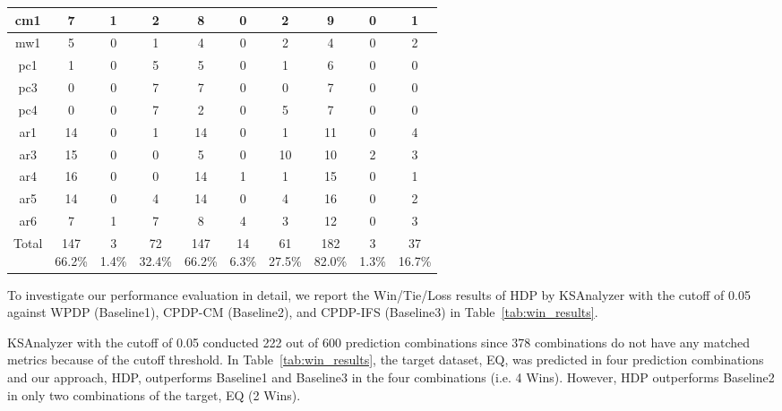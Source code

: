 \begin{table}[!t]
\begin{tabular}{|c||@{ }c@{ }|@{ }c@{ }|@{ }c@{}||@{ }c@{ }|@{ }c@{
}|@{ }c@{}||@{ }c@{ }|@{ }c@{ }|@{ }c@{}|}
cm1			&7	&1	&2 & 8 & 0 & 2 &9 &0 &1	\\ \hline
mw1			&5	&0	&1 & 4 & 0 & 2 &4 &0 &2	\\ \hline
pc1			&1	&0	&5 & 5 & 0 & 1 &6 &0 &0	\\ \hline
pc3			&0	&0	&7 & 7 & 0 & 0 &7 &0 &0	\\ \hline
pc4			&0	&0	&7 & 2 & 0 & 5 &7 &0 &0	\\ \hline \hline

ar1		&14	&0	&1	& 14 & 0 & 1 &11 &0 &4 \\ \hline
ar3		&15	&0	&0	& 5 & 0 & 10 &10 &2 &3 \\ \hline
ar4		&16	&0	&0	& 14 & 1 & 1 &15 &0 &1 \\ \hline
ar5		&14	&0	&4	& 14 & 0 & 4 &16 &0 &2 \\ \hline
ar6		&7	&1	&7	& 8 & 4 & 3  &12 &0 &3 \\ \hline \hline
Total & \specialcell{{147}\\{66.2\%}} &\specialcell{{3}\\{1.4\%}}
&\specialcell{{72}\\{32.4\%}}
& \specialcell{{147}\\{66.2\%}} &\specialcell{{14}\\{6.3\%}}
&\specialcell{{61}\\{27.5\%}}
& \specialcell{{182}\\{82.0\%}} &\specialcell{{3}\\{1.3\%}}
&\specialcell{{37}\\{16.7\%}}
\\
\hline
\end{tabular}
\end{table}


To investigate our performance evaluation in detail, we report
the Win/Tie/Loss results of HDP by KSAnalyzer with the cutoff of 0.05 against
WPDP (Baseline1), CPDP-CM (Baseline2), and CPDP-IFS
(Baseline3) in Table~\ref{tab:win_results}.


KSAnalyzer with the cutoff of 0.05 conducted 222 out of 600 prediction
combinations since 378 combinations do not have any matched
metrics because of the cutoff threshold. In
Table~\ref{tab:win_results}, the target dataset, EQ, was predicted in four
prediction combinations and our approach, HDP, outperforms Baseline1 and
Baseline3 in the four combinations (i.e. 4 Wins). However, HDP outperforms
Baseline2 in only two combinations of the target, EQ (2 Wins). 



